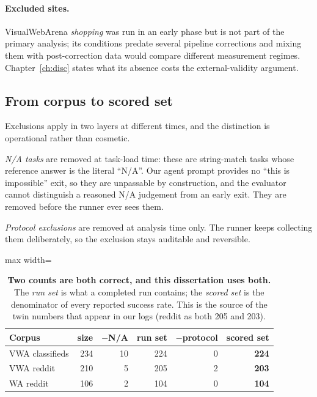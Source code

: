 \paragraph{Excluded sites.} VisualWebArena \emph{shopping} was run in an early
phase but is not part of the primary analysis; its conditions predate several
pipeline corrections and mixing them with post-correction data would compare
different measurement regimes. Chapter~\ref{ch:disc} states what its absence
costs the external-validity argument.

\subsection{From corpus to scored set}
\label{sec:scored-set}

Exclusions apply in two layers at different times, and the distinction is operational rather than cosmetic.

\emph{N/A tasks} are removed at task-load time: these are string-match tasks
whose reference answer is the literal ``N/A''. Our agent prompt provides no
``this is impossible'' exit, so they are unpassable by construction, and the
evaluator cannot distinguish a reasoned N/A judgement from an early exit. They
are removed before the runner ever sees them.

\emph{Protocol exclusions} are removed at analysis time only. The runner keeps
collecting them deliberately, so the exclusion stays auditable and reversible.

\begin{table}[!b]
\centering\small
\caption[Corpus, run set and scored set]{\textbf{Two counts are both correct,
and this dissertation uses both.} The \emph{run set} is what a completed run
contains; the \emph{scored set} is the denominator of every reported success
rate. This is the source of the twin numbers that appear in our logs (reddit as
both 205 and 203).}
\label{tab:scored-set}
\begin{adjustbox}{max width=\textwidth}
\begin{tabular}{@{}lrrrrr@{}}
\toprule
Corpus & size & $-$N/A & run set & $-$protocol & \textbf{scored set} \\
\midrule
VWA classifieds & 234 & 10 & 224 & 0 & \textbf{224} \\
VWA reddit      & 210 &  5 & 205 & 2 & \textbf{203} \\
WA reddit       & 106 &  2 & 104 & 0 & \textbf{104} \\
\bottomrule
\end{tabular}
\end{adjustbox}
\end{table}

